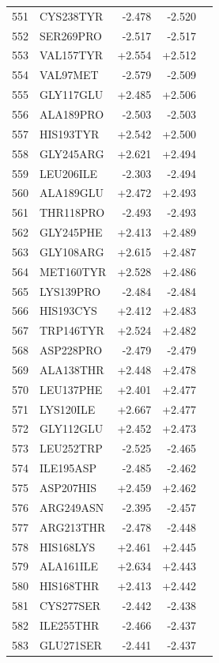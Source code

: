 \begin{longtable}{r l r r c}
551 & CYS238TYR & -2.478 & -2.520 &  \\
552 & SER269PRO & -2.517 & -2.517 &  \\
553 & VAL157TYR & +2.554 & +2.512 &  \\
554 & VAL97MET & -2.579 & -2.509 &  \\
555 & GLY117GLU & +2.485 & +2.506 &  \\
556 & ALA189PRO & -2.503 & -2.503 &  \\
557 & HIS193TYR & +2.542 & +2.500 &  \\
558 & GLY245ARG & +2.621 & +2.494 &  \\
559 & LEU206ILE & -2.303 & -2.494 &  \\
560 & ALA189GLU & +2.472 & +2.493 &  \\
561 & THR118PRO & -2.493 & -2.493 &  \\
562 & GLY245PHE & +2.413 & +2.489 &  \\
563 & GLY108ARG & +2.615 & +2.487 &  \\
564 & MET160TYR & +2.528 & +2.486 &  \\
565 & LYS139PRO & -2.484 & -2.484 &  \\
566 & HIS193CYS & +2.412 & +2.483 &  \\
567 & TRP146TYR & +2.524 & +2.482 &  \\
568 & ASP228PRO & -2.479 & -2.479 &  \\
569 & ALA138THR & +2.448 & +2.478 &  \\
570 & LEU137PHE & +2.401 & +2.477 &  \\
571 & LYS120ILE & +2.667 & +2.477 &  \\
572 & GLY112GLU & +2.452 & +2.473 &  \\
573 & LEU252TRP & -2.525 & -2.465 &  \\
574 & ILE195ASP & -2.485 & -2.462 &  \\
575 & ASP207HIS & +2.459 & +2.462 &  \\
576 & ARG249ASN & -2.395 & -2.457 &  \\
577 & ARG213THR & -2.478 & -2.448 &  \\
578 & HIS168LYS & +2.461 & +2.445 &  \\
579 & ALA161ILE & +2.634 & +2.443 &  \\
580 & HIS168THR & +2.413 & +2.442 &  \\
581 & CYS277SER & -2.442 & -2.438 &  \\
582 & ILE255THR & -2.466 & -2.437 &  \\
583 & GLU271SER & -2.441 & -2.437 &  \\

\end{longtable}

